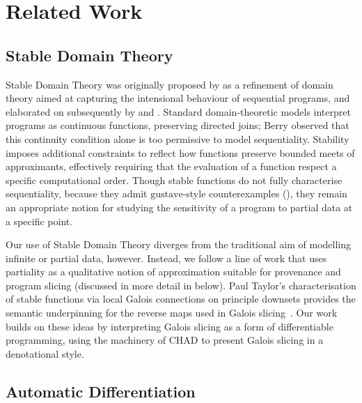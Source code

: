\section{Related Work}
\label{sec:related-work}

\subsection{Stable Domain Theory}

Stable Domain Theory was originally proposed by \citet{berry79} as a refinement of domain theory aimed at
capturing the intensional behaviour of sequential programs, and elaborated on subsequently by \citet{berry82}
and \citet{amadio-curien}. Standard domain-theoretic models interpret programs as continuous functions,
preserving directed joins; Berry observed that this continuity condition alone is too permissive to model
sequentiality. Stability imposes additional constraints to reflect how functions preserve bounded meets of
approximants, effectively requiring that the evaluation of a function respect a specific computational order.
Though stable functions do not fully characterise sequentiality, because they admit $\mathrm{gustave}$-style
counterexamples (), they remain an appropriate notion for studying the sensitivity of a
program to partial data at a specific point.

Our use of Stable Domain Theory diverges from the traditional aim of modelling infinite or partial data,
however. Instead, we follow a line of work that uses partiality as a qualitative notion of approximation
suitable for provenance and program slicing (discussed in more detail in 
below). Paul Taylor’s characterisation of stable functions via local Galois connections on principle downsets
provides the semantic underpinning for the reverse maps used in Galois slicing~\cite{taylor99}. Our work
builds on these ideas by interpreting Galois slicing as a form of differentiable programming, using the
machinery of CHAD to present Galois slicing in a denotational style.

\subsection{Automatic Differentiation}

